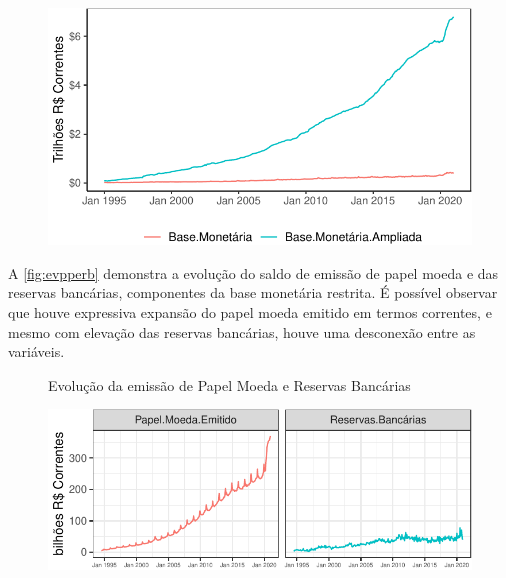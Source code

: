 \documentclass[12pt,12pt,openright,oneside,a4paper,chapter=TITLE,section=TITLE,subsection=TITLE,subsubsection=TITLE,english,french,spanish,portugues,sumario=tradicional]{abntex2}
\begin{document}
\begin{figure}

\begin{center}\includegraphics{12-exportedfigures/money base.d-1} \end{center}
\label{fig:moneybases}
\end{figure}

A \autoref{fig:evpperb} demonstra a evolução do saldo de emissão de papel moeda e das reservas bancárias, componentes da base monetária restrita. É possível observar que houve expressiva expansão do papel moeda emitido em termos correntes, e mesmo com elevação das reservas bancárias, houve uma desconexão entre as variáveis.

\begin{figure}
 {Evolução da emissão de Papel Moeda e Reservas Bancárias}

\begin{center}\includegraphics{12-exportedfigures/base moneybase.e-1} \end{center}
\label{fig:evpperb}
\end{figure}
\end{document}
